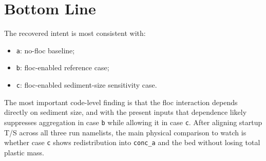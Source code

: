\documentclass[11pt]{article}
\begin{document}
\section{Bottom Line}
The recovered intent is most consistent with:
\begin{itemize}
\item \texttt{a}: no-floc baseline;
\item \texttt{b}: floc-enabled reference case;
\item \texttt{c}: floc-enabled sediment-size sensitivity case.
\end{itemize}

The most important code-level finding is that the floc interaction depends directly on sediment size, and
with the present inputs that dependence likely suppresses aggregation in case \texttt{b} while allowing it
in case \texttt{c}. After aligning startup T/S across all three run namelists, the main physical comparison
to watch is whether case \texttt{c} shows redistribution into \texttt{conc\_a} and the bed without losing
total plastic mass.
\end{document}
